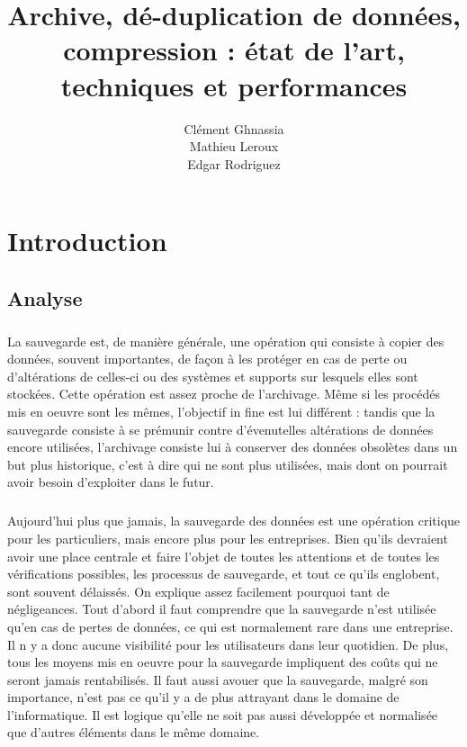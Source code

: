 \documentclass[a4paper,11pt]{report}
\title{Archive, dé-duplication de données, compression : état de l'art, techniques et performances}
\author{Clément Ghnassia \\Mathieu Leroux \\Edgar Rodriguez}
\begin{document}
\maketitle
\tableofcontents

\chapter{Introduction}

\section{Analyse}

\paragraph{}
La sauvegarde est, de manière générale, une opération qui consiste à copier des données, souvent importantes, de façon à les protéger en cas de perte ou d'altérations de celles-ci ou des systèmes et supports sur lesquels elles sont stockées. 
Cette opération est assez proche de l'archivage. Même si les procédés mis en oeuvre sont les mêmes, l'objectif in fine est lui différent : 
tandis que la sauvegarde consiste à se prémunir contre d'évenutelles altérations de données encore utilisées, l'archivage consiste lui à conserver des données obsolètes dans un but plus historique, c'est à dire qui ne sont plus utilisées, mais dont on pourrait avoir besoin d'exploiter dans le futur.

\paragraph{}
Aujourd'hui plus que jamais, la sauvegarde des données est une opération critique pour les particuliers, mais encore plus pour les entreprises.
Bien qu'ils devraient avoir une place centrale et faire l'objet de toutes les attentions et de toutes les vérifications possibles, les processus de sauvegarde, et tout ce qu'ils englobent, sont souvent délaissés.
On explique assez facilement pourquoi tant de négligeances. 
Tout d'abord il faut comprendre que la sauvegarde n'est utilisée qu'en cas de pertes de données, ce qui est normalement rare dans une entreprise. 
Il n y a donc aucune visibilité pour les utilisateurs dans leur quotidien.
De plus, tous les moyens mis en oeuvre pour la sauvegarde impliquent des coûts qui ne seront jamais rentabilisés.
Il faut aussi avouer que la sauvegarde, malgré son importance, n'est pas ce qu'il y a de plus attrayant dans le domaine de l'informatique. 
Il est logique qu'elle ne soit pas aussi développée et normalisée que d'autres éléments dans le même domaine.
\end{document}
